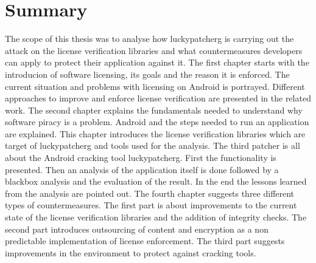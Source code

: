 \section{Summary}\label{section:conclusion-summary}
The scope of this thesis was to analyse how \gls{luckypatcherg} is carrying out the attack on the license verification libraries and what countermeasures developers can apply to protect their application against it.
\newline
\newline
The first chapter starts with the introducion of software licensing, its goals and the reason it is enforced.
The current situation and problems with licensing on Android is portrayed.
Different approaches to improve and enforce license verification are presented in the related work.
\newline
The second chapter explains the fundamentals needed to understand why software piracy is a problem.
Android and the steps needed to run an application are explained.
This chapter introduces the license verification libraries which are target of \gls{luckypatcherg} and tools used for the analysis.
\newline
The third patcher is all about the Android cracking tool \gls{luckypatcherg}.
First the functionality is presented.
Then an analysis of the application itself is done followed by a blackbox analysis and the evaluation of the result.
In the end the lessons learned from the analysis are pointed out.
\newline
The fourth chapter suggests three different types of countermeasures.
The first part is about improvements to the current state of the license verification libraries and the addition of integrity checks.
The second part introduces outsourcing of content and encryption as a non predictable implementation of license enforcement.
The third part suggests improvements in the environment to protect against cracking tools.
